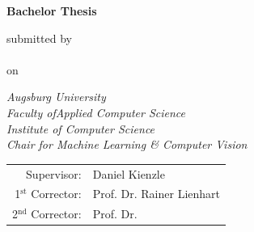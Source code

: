 \newcommand{\mail}{jan.claar@student.uni-augsburg.de}

\begin{titlepage} 
     \color{dblue}
    \begin{center} \vspace*{2cm} \Huge \textbf{\thetitle}
        
        \vspace*{1.5cm} 
        
        \color{black} \textbf{Bachelor Thesis}

        \vspace*{1cm} 

        \normalsize submitted by\\ \LARGE \theauthor\\\vspace*{0.3cm} \normalsize on \thedate

        \vspace{1.8cm} 

        \color{black} \emph{Augsburg University}\\ \emph{Faculty ofApplied Computer Science}\\ \emph{Institute of Computer Science}\\ \emph{Chair for Machine Learning \& Computer Vision}
        \vfill

        \begin{tabular}{rl}
            Supervisor: & Daniel Kienzle\\ 
            1$^\text{st}$ Corrector: &Prof. Dr. Rainer Lienhart\\
            2$^\text{nd}$ Corrector: &Prof. Dr. \\%
        \end{tabular} 
    \end{center}

\end{titlepage}